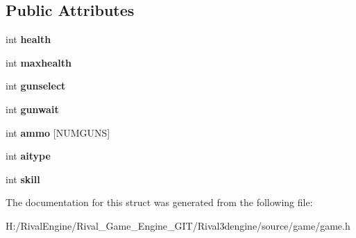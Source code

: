 \subsection*{Public Attributes}
\begin{DoxyCompactItemize}
\item 
\mbox{\label{structgamestate_a4419b76fa9ce49784b580d42b2f4db2c}} 
int {\bfseries health}
\item 
\mbox{\label{structgamestate_a6fefe845b162b52a286c542422e8317a}} 
int {\bfseries maxhealth}
\item 
\mbox{\label{structgamestate_a61a239a37419bb354cc407a7f4aafcbc}} 
int {\bfseries gunselect}
\item 
\mbox{\label{structgamestate_a07fc227a67228ad47d9db8477b6212d3}} 
int {\bfseries gunwait}
\item 
\mbox{\label{structgamestate_a07c2af3e09994ee8bbbcd75714348235}} 
int {\bfseries ammo} \mbox{[}N\+U\+M\+G\+U\+NS\mbox{]}
\item 
\mbox{\label{structgamestate_aa08f0b162cf7bf5b9b9ac469f637a9f3}} 
int {\bfseries aitype}
\item 
\mbox{\label{structgamestate_a67b62dbd716253e15e7ec31b28ffb595}} 
int {\bfseries skill}
\end{DoxyCompactItemize}


The documentation for this struct was generated from the following file\+:\begin{DoxyCompactItemize}
\item 
H\+:/\+Rival\+Engine/\+Rival\+\_\+\+Game\+\_\+\+Engine\+\_\+\+G\+I\+T/\+Rival3dengine/source/game/game.\+h\end{DoxyCompactItemize}
